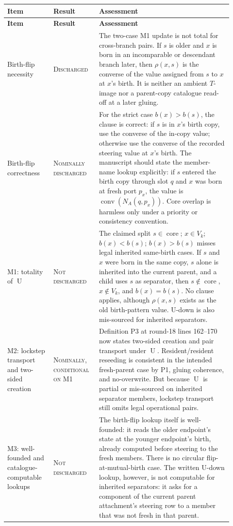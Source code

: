 \documentclass[11pt]{article}
\newcommand{\core}{\operatorname{core}}
\newcommand{\Uop}{\operatorname{U}}
\newcommand{\status}[1]{\textsc{#1}}
\newcommand{\rhoR}{\rho}
\theoremstyle{remark}
\begin{document}
\begin{longtable}{>{\raggedright\arraybackslash}p{0.19\linewidth} >{\raggedright\arraybackslash}p{0.18\linewidth} >{\raggedright\arraybackslash}p{0.55\linewidth}}
\toprule
\textbf{Item} & \textbf{Result} & \textbf{Assessment} \\
\midrule
\endfirsthead
\toprule
\textbf{Item} & \textbf{Result} & \textbf{Assessment} \\
\midrule
\endhead
\bottomrule
\endfoot
Birth-flip necessity & \status{Discharged} & The two-case M1 update is not total for cross-branch pairs.  If $s$ is older and $x$ is born in an incomparable or descendant branch later, then $\rhoR(x,s)$ is the converse of the value assigned from $s$ to $x$ at $x$'s birth.  It is neither an ambient $T$-image nor a parent-copy catalogue read-off at a later gluing. \\
\addlinespace
Birth-flip correctness & \status{Nominally discharged} & For the strict case $b(x)>b(s)$, the clause is correct: if $s$ is in $x$'s birth copy, use the converse of the in-copy value; otherwise use the converse of the recorded steering value at $x$'s birth.  The manuscript should state the member-name lookup explicitly: if $s$ entered the birth copy through slot $q$ and $x$ was born at fresh port $p_x$, the value is $\operatorname{conv}(N_A(q,p_x))$.  Core overlap is harmless only under a priority or consistency convention. \\
\addlinespace
M1: totality of $\Uop$ & \status{Not discharged} & The claimed split $s\in\core$; $x\in V_k$; $b(x)<b(s)$; $b(x)>b(s)$ misses legal inherited same-birth cases.  If $s$ and $x$ were born in the same copy, $s$ alone is inherited into the current parent, and a child uses $s$ as separator, then $s\notin\core$, $x\notin V_k$, and $b(x)=b(s)$.  No clause applies, although $\rhoR(x,s)$ exists as the old birth-pattern value.  U-down is also mis-sourced for inherited separators. \\
\addlinespace
M2: lockstep transport and two-sided creation & \status{Nominally, conditional on M1} & Definition P3 at round-18 lines 162--170 now states two-sided creation and pair transport under $\Uop$.  Resident/resident reseeding is consistent in the intended fresh-parent case by P1, gluing coherence, and no-overwrite.  But because $\Uop$ is partial or mis-sourced on inherited separator members, lockstep transport still omits legal operational pairs. \\
\addlinespace
M3: well-founded and catalogue-computable lookups & \status{Not discharged} & The birth-flip lookup itself is well-founded: it reads the older endpoint's state at the younger endpoint's birth, already computed before steering to the fresh members.  There is no circular flip-at-mutual-birth case.  The written U-down lookup, however, is not computable for inherited separators: it asks for a component of the current parent attachment's steering row to a member that was not fresh in that parent. \\

\end{longtable}
\end{document}
